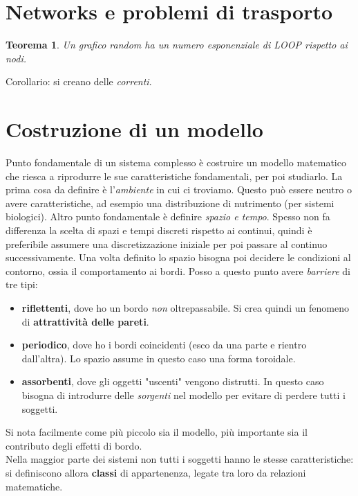\documentclass[12pt, a4paper]{article}
\theoremstyle{theorem}
\newtheorem{theorem}{Teorema}[section]
\begin{document}
	\section{Networks e problemi di trasporto}
		\begin{theorem}
			Un grafico random ha un numero esponenziale di LOOP rispetto ai nodi.
		\end{theorem}
		Corollario: si creano delle \textit{correnti}.






	\section{Costruzione di un modello}
		Punto fondamentale di un sistema complesso è costruire un modello matematico che riesca a riprodurre le sue caratteristiche fondamentali, per poi studiarlo.
		La prima cosa da definire è l'\textit{ambiente} in cui ci troviamo. Questo può essere neutro o avere caratteristiche, ad esempio una distribuzione di nutrimento (per sistemi biologici).
		Altro punto fondamentale è definire \textit{spazio e tempo}. Spesso non fa differenza la scelta di spazi e tempi discreti rispetto ai continui, quindi è preferibile assumere una discretizzazione iniziale per poi passare al continuo successivamente.
		Una volta definito lo spazio bisogna poi decidere le condizioni al contorno, ossia il comportamento ai bordi. 
		Posso a questo punto avere \textit{barriere} di tre tipi:
		\begin{itemize}
			\item \textbf{riflettenti}, dove ho un bordo \textit{non} oltrepassabile. Si crea quindi un fenomeno di \textbf{attrattività delle pareti}.
			\item \textbf{periodico}, dove ho i bordi coincidenti (esco da una parte e rientro dall'altra). Lo spazio assume in questo caso una forma toroidale.
			\item \textbf{assorbenti}, dove gli oggetti "uscenti" vengono distrutti. In questo caso bisogna di introdurre delle \textit{sorgenti} nel modello per evitare di perdere tutti i soggetti.
		\end{itemize}
		Si nota facilmente come più piccolo sia il modello, più importante sia il contributo degli effetti di bordo.\\
		Nella maggior parte dei sistemi non tutti i soggetti hanno le stesse caratteristiche: si definiscono allora \textbf{classi} di appartenenza, legate tra loro da relazioni matematiche.
\end{document}
